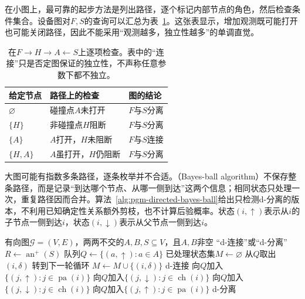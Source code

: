 在小图上，最可靠的起步方法是列出路径，逐个标记内部节点的角色，然后检查条件集合。设备图对$F,S$的查询可以汇总为表~\ref{tab:pgm-directed-path-tests}。这张表显示，增加观测既可能打开也可能关闭路径，因此不能采用“观测越多，独立性越多”的单调直觉。

\begin{table}[htbp]
  \centering
  \begin{tabularx}{\linewidth}{@{}lXX@{}}
    \toprule
    给定节点 & 路径上的检查 & 图的结论 \\
    \midrule
    $\varnothing$ & 碰撞点$A$未打开 & $F$与$S$分离 \\
    $\{H\}$ & 非碰撞点$H$阻断 & $F$与$S$分离 \\
    $\{A\}$ & $A$打开，$H$未阻断 & $F$与$S$连接 \\
    $\{H,A\}$ & $A$虽打开，$H$仍阻断 & $F$与$S$分离 \\
    \bottomrule
  \end{tabularx}
  \caption{在$F\to H\to A\leftarrow S$上逐项检查。表中的“连接”只是否定图保证的独立性，不声称任意参数下都不独立。}
  \label{tab:pgm-directed-path-tests}
\end{table}
\FloatBarrier

大图可能有指数多条路径，逐条枚举并不合适。（Bayes-ball algorithm）不保存整条路径，而是记录“到达哪个节点、从哪一侧到达”这两个信息；相同状态只处理一次，重复路径因而合并。算法~\ref{alg:pgm-directed-bayes-ball}给出只检测d-分离的版本，不利用已知确定性关系额外剪枝，也不计算后验概率。状态$(i,\uparrow)$表示从$i$的子节点一侧到达$i$，状态$(i,\downarrow)$表示从父节点一侧到达$i$。

\begin{algorithm}
  \label{alg:pgm-directed-bayes-ball}
  \begin{algorithmic}[1]
    \Require 有向图$\mathcal{G}=(V,E)$，两两不交的$A,B,S\subseteq V$，且$A,B$非空
    \Ensure “d-连接”或“d-分离”
    \State $R\gets\operatorname{an}^{+}(S)$
    \State 队列$Q\gets\{(a,\uparrow):a\in A\}$
    \State 已处理状态集$M\gets\varnothing$
      \State 从$Q$取出$(i,\delta)$
        \State 转到下一轮循环
      \EndIf
      \State $M\gets M\cup\{(i,\delta)\}$
        \State \Return d-连接
      \EndIf
        \State 向$Q$加入$\{(j,\uparrow):j\in\operatorname{pa}(i)\}$
        \State 向$Q$加入$\{(j,\downarrow):j\in\operatorname{ch}(i)\}$
      \ElsIf{$\delta=\downarrow$}
          \State 向$Q$加入$\{(j,\downarrow):j\in\operatorname{ch}(i)\}$
        \EndIf
          \State 向$Q$加入$\{(j,\uparrow):j\in\operatorname{pa}(i)\}$
        \EndIf
      \EndIf
    \EndWhile
    \State \Return d-分离
  \end{algorithmic}
\end{algorithm}


